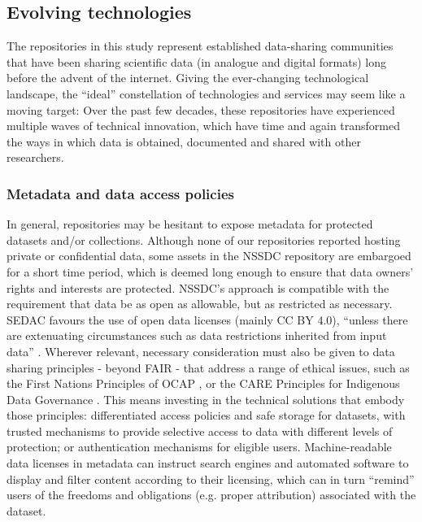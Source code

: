\documentclass{interact}
\begin{document}
\subsection{Evolving technologies}
The repositories in this study represent established data-sharing communities that have been sharing scientific data (in analogue and digital formats) long before the advent of the internet. Giving the ever-changing technological landscape, the ``ideal'' constellation of technologies and services may seem like a moving target: Over the past few decades, these repositories have experienced multiple waves of technical innovation, which have time and again transformed the ways in which data is obtained, documented and shared with other researchers. 

\subsubsection{Metadata and data access policies}
In general, repositories may be hesitant to expose metadata for protected datasets and/or collections. Although none of our repositories reported hosting private or confidential data, some assets in the NSSDC repository are embargoed for a short time period, which is deemed long enough to ensure that data owners’ rights and interests are protected. NSSDC's approach is compatible with the requirement that data be as open as allowable, but as restricted as necessary. SEDAC favours the use of open data licenses (mainly CC BY 4.0), ``unless there are extenuating circumstances such as data restrictions inherited from input data'' \parencite{sedac_data_2021}. Wherever relevant, necessary consideration must also be given to data sharing principles - beyond FAIR - that address a range of ethical issues, such as the First Nations Principles of OCAP \parencite{fnigc_barriers_2014}, or the CARE Principles for Indigenous Data Governance \parencite{carroll_care_2020}. This means investing in the technical solutions that embody those principles: differentiated access policies and safe storage for datasets, with trusted mechanisms to provide selective access to data with different levels of protection; or authentication mechanisms for eligible users. Machine-readable data licenses in metadata \parencite{creative_commons_creative_2002} can instruct search engines and automated software to display and filter content according to their licensing, which can in turn “remind” users of the freedoms and obligations (e.g. proper attribution) associated with the dataset.
\end{document}
